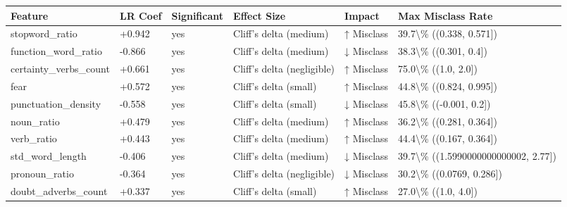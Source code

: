 \begin{tabular}{llllll}
\toprule
Feature & LR Coef & Significant & Effect Size & Impact & Max Misclass Rate \\
\midrule
stopword\_ratio & +0.942 & yes & Cliff's delta (medium) & ↑ Misclass & 39.7\textbackslash \% ((0.338, 0.571]) \\
function\_word\_ratio & -0.866 & yes & Cliff's delta (medium) & ↓ Misclass & 38.3\textbackslash \% ((0.301, 0.4]) \\
certainty\_verbs\_count & +0.661 & yes & Cliff's delta (negligible) & ↑ Misclass & 75.0\textbackslash \% ((1.0, 2.0]) \\
fear & +0.572 & yes & Cliff's delta (small) & ↑ Misclass & 44.8\textbackslash \% ((0.824, 0.995]) \\
punctuation\_density & -0.558 & yes & Cliff's delta (small) & ↓ Misclass & 45.8\textbackslash \% ((-0.001, 0.2]) \\
noun\_ratio & +0.479 & yes & Cliff's delta (medium) & ↑ Misclass & 36.2\textbackslash \% ((0.281, 0.364]) \\
verb\_ratio & +0.443 & yes & Cliff's delta (medium) & ↑ Misclass & 44.4\textbackslash \% ((0.167, 0.364]) \\
std\_word\_length & -0.406 & yes & Cliff's delta (medium) & ↓ Misclass & 39.7\textbackslash \% ((1.5990000000000002, 2.77]) \\
pronoun\_ratio & -0.364 & yes & Cliff's delta (negligible) & ↓ Misclass & 30.2\textbackslash \% ((0.0769, 0.286]) \\
doubt\_adverbs\_count & +0.337 & yes & Cliff's delta (small) & ↑ Misclass & 27.0\textbackslash \% ((1.0, 4.0]) \\
\bottomrule
\end{tabular}

